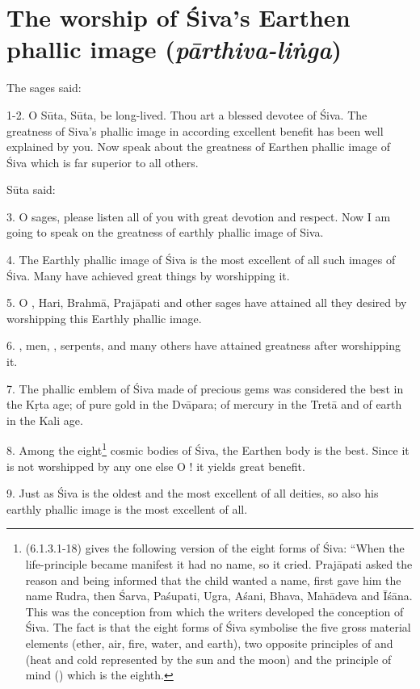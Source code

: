 \chapter{The worship of Śiva’s Earthen phallic image (\emph{pārthiva-liṅga})}

The sages said:

1-2. O Sūta, Sūta, be long-lived. Thou art a blessed devotee of Śiva.
The greatness of Siva’s phallic image in according excellent benefit has been
well explained by you. Now speak about the greatness of Earthen phallic image of
Śiva which is far superior to all others.

Sūta said:

3. O sages, please listen all of you with great devotion and respect. Now I am
going to speak on the greatness of earthly phallic image of Siva.

4. The Earthly phallic image of Śiva is the most excellent of all such images of
Śiva. Many  have achieved great things by worshipping it.

5. O , Hari, Brahmā, Prajāpati and other sages have attained all
they desired by worshipping this Earthly phallic image.

6. , men, , serpents,  and many
others have attained greatness after worshipping it.

7. The phallic emblem of Śiva made of precious gems was considered the best in
the Kṛta age; of pure gold in the Dvāpara; of mercury in the Tretā and of earth
in the Kali age.

8. Among the eight\footnote{ (6.1.3.1-18) gives
the following version of the eight forms of Śiva: “When the life-principle
became manifest it had no name, so it cried. Prajāpati asked the reason and
being informed that the child wanted a name, first gave him the name Rudra,
then Śarva, Paśupati, Ugra, Aśani, Bhava, Mahādeva and Īśāna. This was
the conception from which the  writers developed the 
conception of Śiva. The fact is that the eight forms of Śiva symbolise the five
gross material elements (ether, air, fire, water, and earth), two opposite
principles of  and  (heat and cold represented by the sun
and the moon) and the principle of mind () which is the eighth.}
cosmic bodies of Śiva, the Earthen body is the best. Since it is not worshipped
by any one else O ! it yields great benefit.

9. Just as Śiva is the oldest and the most excellent of all deities, so also his
earthly phallic image is the most excellent of all.

